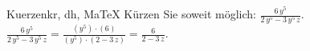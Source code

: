\begin{MAufgabe}{Kuerzen}{kr, dh, MaTeX}
K\"urzen Sie soweit m\"oglich: $\frac{6\, y^5}{2\, y^5 - 3\, y^5\, z}$.\\ 
\ifLsg\MLoesung
\quad $\frac{6\, y^5}{2\, y^5 - 3\, y^5\, z}=\frac{(y^5)\cdot(6)}{(y^5)\cdot(2 - 3\, z)}=\frac{6}{2 - 3\, z}$.\else\relax\fi
 \end{MAufgabe}